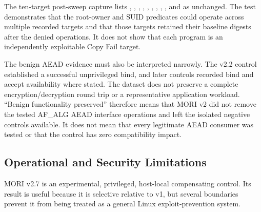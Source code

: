 The ten-target post-sweep capture lists , ,
, , , ,
, , , and  as unchanged. The
test demonstrates that the root-owner and SUID predicates could operate across
multiple recorded targets and that those targets retained their baseline
digests after the denied operations. It does not show that each program is an
independently exploitable Copy Fail target.

The benign AEAD evidence must also be interpreted narrowly. The v2.2 control
established a successful unprivileged  bind, and later controls
recorded bind and accept availability where stated. The dataset does not
preserve a complete encryption/decryption round trip or a representative
application workload. ``Benign functionality preserved'' therefore means that
MORI v2 did not remove the tested AF\_ALG AEAD interface operations and left
the isolated negative controls available. It does not mean that every legitimate
AEAD consumer was tested or that the control has zero compatibility impact.

\subsection{Operational and Security Limitations}

MORI v2.7 is an experimental, privileged, host-local compensating control. Its
result is useful because it is selective relative to v1, but several boundaries
prevent it from being treated as a general Linux exploit-prevention system.

